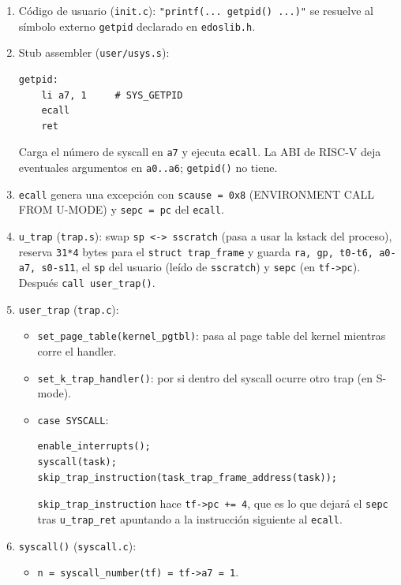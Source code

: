 \documentclass[11pt,a4paper]{article}
\begin{document}
\begin{enumerate}[leftmargin=1.6em]
    \item Código de usuario (\texttt{init.c}):
    \texttt{"printf(... getpid() ...)"} se resuelve al símbolo externo
    \texttt{getpid} declarado en \texttt{edoslib.h}.
    \item Stub assembler (\texttt{user/usys.s}):
    \begin{lstlisting}[style=cstyle]
getpid:
    li a7, 1     # SYS_GETPID
    ecall
    ret
    \end{lstlisting}
    Carga el número de syscall en \texttt{a7} y ejecuta \texttt{ecall}. La ABI de
    RISC-V deja eventuales argumentos en \texttt{a0..a6}; \texttt{getpid()} no
    tiene.
    \item \texttt{ecall} genera una excepción con \texttt{scause = 0x8}
    (ENVIRONMENT CALL FROM U-MODE) y \texttt{sepc = pc} del \texttt{ecall}.
    \item \texttt{u\_trap} (\texttt{trap.s}): swap \texttt{sp <-> sscratch} (pasa a
    usar la kstack del proceso), reserva \texttt{31*4} bytes para el
    \texttt{struct trap\_frame} y guarda \texttt{ra, gp, t0-t6, a0-a7, s0-s11},
    el \texttt{sp} del usuario (leído de \texttt{sscratch}) y \texttt{sepc} (en
    \texttt{tf->pc}). Después \texttt{call user\_trap()}.
    \item \texttt{user\_trap} (\texttt{trap.c}):
    \begin{itemize}[leftmargin=1.2em]
        \item \texttt{set\_page\_table(kernel\_pgtbl)}: pasa al page table del
        kernel mientras corre el handler.
        \item \texttt{set\_k\_trap\_handler()}: por si dentro del syscall ocurre
        otro trap (en S-mode).
        \item \texttt{case SYSCALL}:
        \begin{lstlisting}[style=cstyle]
enable_interrupts();
syscall(task);
skip_trap_instruction(task_trap_frame_address(task));
        \end{lstlisting}
        \texttt{skip\_trap\_instruction} hace \texttt{tf->pc += 4}, que es lo que
        dejará el \texttt{sepc} tras \texttt{u\_trap\_ret} apuntando a la
        instrucción siguiente al \texttt{ecall}.
    \end{itemize}
    \item \texttt{syscall()} (\texttt{syscall.c}):
    \begin{itemize}[leftmargin=1.2em]
        \item \texttt{n = syscall\_number(tf) = tf->a7 = 1}.

\end{itemize}
\end{enumerate}
\end{document}
